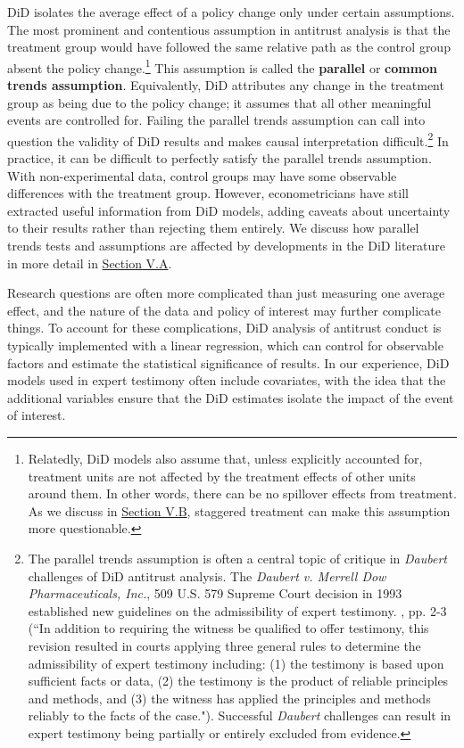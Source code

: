 \documentclass[12pt]{article}
\begin{document}
DiD isolates the average effect of a policy change only under certain assumptions. The most prominent and contentious assumption in antitrust analysis is that the treatment group would have followed the same relative path as the control group absent the policy change.\footnote{Relatedly, DiD models also assume that, unless explicitly accounted for, treatment units are not affected by the treatment effects of other units around them. In other words, there can be no spillover effects from treatment. As we discuss in \hyperref[sec:notyettreated]{Section V.B}, staggered treatment can make this assumption more questionable.} This assumption is called the \textbf{parallel} or \textbf{common trends assumption}. Equivalently, DiD attributes any change in the treatment group as being due to the policy change; it assumes that all other meaningful events are controlled for. Failing the parallel trends assumption can call into question the validity of DiD results and makes causal interpretation difficult.\footnote{\label{footnote:daubert} The parallel trends assumption is often a central topic of critique in \textit{Daubert} challenges of DiD antitrust analysis. The \textit{Daubert v. Merrell Dow Pharmaceuticals, Inc.}, 509 U.S. 579 Supreme Court decision in 1993 established new guidelines on the admissibility of expert testimony. \citet{langenfeld2010daubert}, pp. 2-3 (``In addition to requiring the witness be qualified to offer testimony, this revision resulted in courts applying three general rules to determine the admissibility of expert testimony including: (1) the testimony is based upon sufficient facts or data, (2) the testimony is the product of reliable principles and methods, and (3) the witness has applied the principles and methods reliably to the facts of the case."). Successful \textit{Daubert} challenges can result in expert testimony being partially or entirely excluded from evidence.} In practice, it can be difficult to perfectly satisfy the parallel trends assumption. With non-experimental data, control groups may have some observable differences with the treatment group. However, econometricians have still extracted useful information from DiD models, adding caveats about uncertainty to their results rather than rejecting them entirely. We discuss how parallel trends tests and assumptions are affected by developments in the DiD literature in more detail in \hyperref[sec:parallel-trends]{Section V.A}.

Research questions are often more complicated than just measuring one average effect, and the nature of the data and policy of interest may further complicate things. To account for these complications, DiD analysis of antitrust conduct is typically implemented with a linear regression, which can control for observable factors and estimate the statistical significance of results. In our experience, DiD models used in expert testimony often include covariates, with the idea that the additional variables ensure that the DiD estimates isolate the impact of the event of interest.
\end{document}
